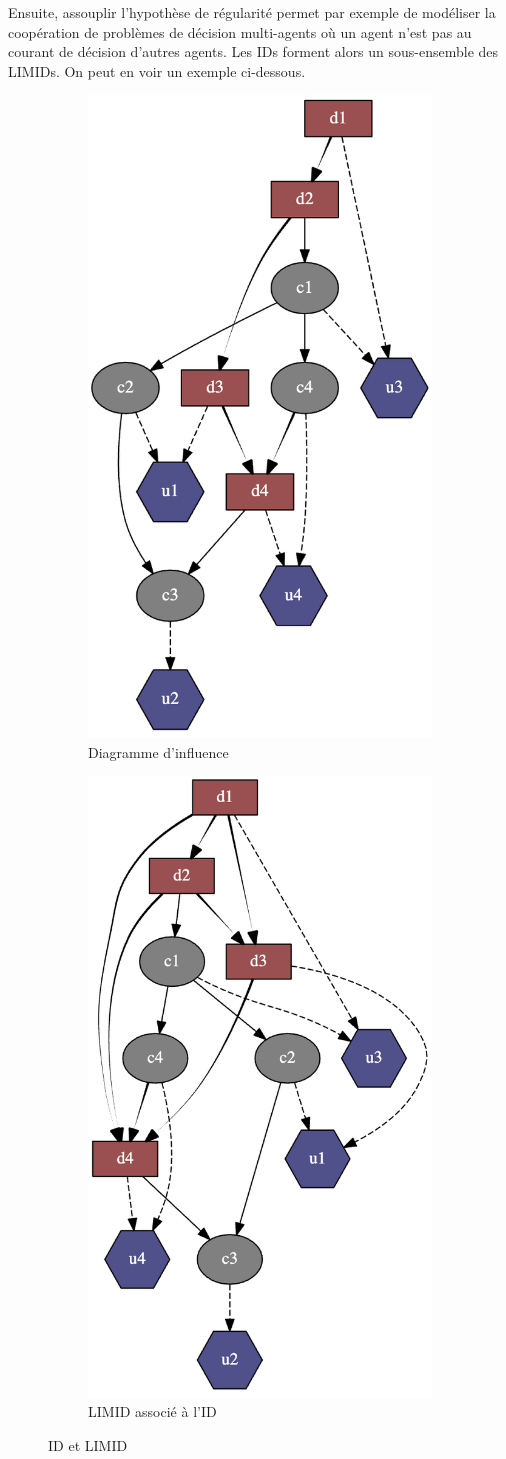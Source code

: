 \documentclass[12pt]{article}
\begin{document}
Ensuite, assouplir l'hypothèse de régularité permet par exemple de modéliser la coopération de problèmes de décision multi-agents où un agent n'est pas au courant de décision d'autres agents. 
Les IDs forment alors un sous-ensemble des LIMIDs. On peut en voir un exemple ci-dessous.
\begin{figure}[ht]
\centering
\begin{subfigure}{.5\textwidth}
  \centering
  \includegraphics[width=.5\linewidth]{docs/ressources_rapport/ID_LIMID.png}
  \caption{Diagramme d'influence}
  \label{fig:sub3}
\end{subfigure}%
\begin{subfigure}{.5\textwidth}
  \centering
  \includegraphics[width=0.5\linewidth]{docs/ressources_rapport/LIMID_ID.png}
  \caption{LIMID associé à l'ID}
  \label{fig:sub4}
\end{subfigure}
\caption{ID et LIMID}
\label{fig:test1}
\end{figure}
\end{document}
